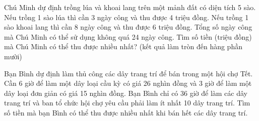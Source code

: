 \begin{ex}
 Chú Minh dự định trồng lúa và khoai lang trên một mảnh đất có diện tích 5 sào. Nếu trồng 1 sào lúa thì cần 3 ngày công và thu được 4 triệu đồng. Nếu trồng 1 sào khoai lang thì cần 8 ngày công và thu được 6 triệu đồng. Tổng số ngày công mà Chú Minh có thể sử dụng không quá 24 ngày công. Tìm số tiền (triệu đồng) mà Chú Minh có thể thu được nhiều nhất? (kết quả làm tròn đến hàng phần mười)


\end{ex}

\begin{ex}
 Bạn Bình dự định làm thủ công các dây trang trí để bán trong một hội chợ Tết. Cần 6 giờ để làm một dây loại cầu kỳ có giá 26 nghìn đồng và 3 giờ để làm một dây loại đơn giản có giá 15 nghìn đồng. Bạn Bình chỉ có 36 giờ để làm các dây trang trí và ban tổ chức hội chợ yêu cầu phải làm ít nhất 10 dây trang trí. Tìm số tiền mà bạn Bình có thể thu được nhiều nhất khi bán hết các dây trang trí.


\end{ex}

